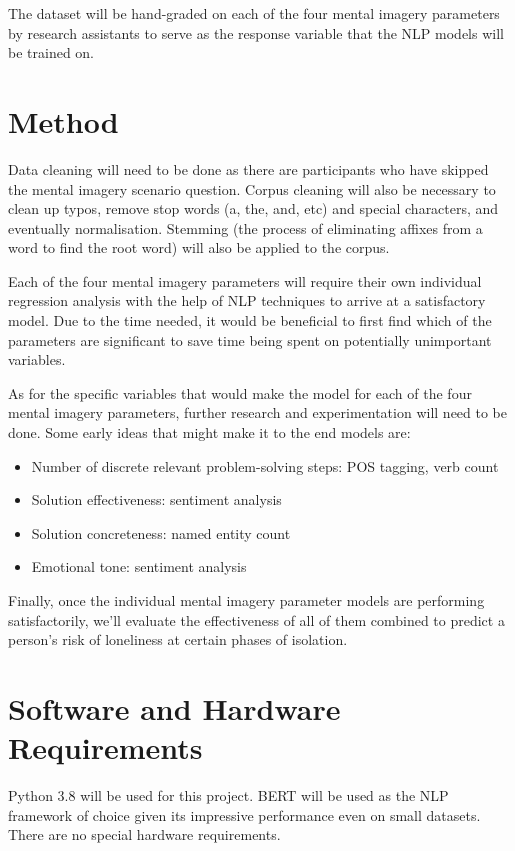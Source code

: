 \documentclass[12pt, a4paper]{article}
\begin{document}
The dataset will be hand-graded on each of the four mental imagery parameters by research assistants to serve as the response variable that the NLP models will be trained on. 
 
\section*{Method}
Data cleaning will need to be done as there are participants who have skipped the mental imagery scenario question. Corpus cleaning will also be necessary to clean up typos, remove stop words (a, the, and, etc) and special characters, and eventually normalisation. Stemming (the process of eliminating affixes from a word to find the root word) will also be applied to the corpus.

Each of the four mental imagery parameters will require their own individual regression analysis with the help of NLP techniques to arrive at a satisfactory model. Due to the time needed, it would be beneficial to first find which of the parameters are significant to save time being spent on potentially unimportant variables.

As for the specific variables that would make the model for each of the four mental imagery parameters, further research and experimentation will need to be done. Some early ideas that might make it to the end models are: 

\begin{itemize}
	\item Number of discrete relevant problem-solving steps: POS tagging, verb count
	\item Solution effectiveness: sentiment analysis
	\item Solution concreteness: named entity count
	\item Emotional tone: sentiment analysis
\end{itemize}

Finally, once the individual mental imagery parameter models are performing satisfactorily, we'll evaluate the effectiveness of all of them combined to predict a person's risk of loneliness at certain phases of isolation.

\section*{Software and Hardware Requirements}

Python 3.8 will be used for this project. BERT \cite{bert} will be used as the NLP framework of choice given its impressive performance even on small datasets. There are no special hardware requirements.

\nocite{bertsentimentanalysis}
\nocite{nonclinicalnlp}


\end{document}
